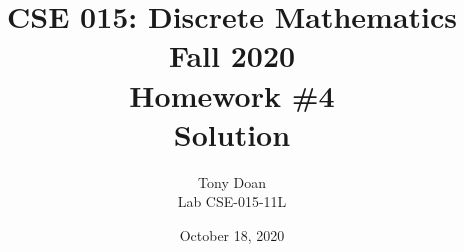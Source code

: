 \documentclass[11pt]{article}
\begin{document}
\author{Tony Doan\\
Lab CSE-015-11L }

\title{CSE 015: Discrete Mathematics\\
Fall 2020\\
Homework \#4\\
Solution}

\date{October 18, 2020}
\maketitle

\end{document}
